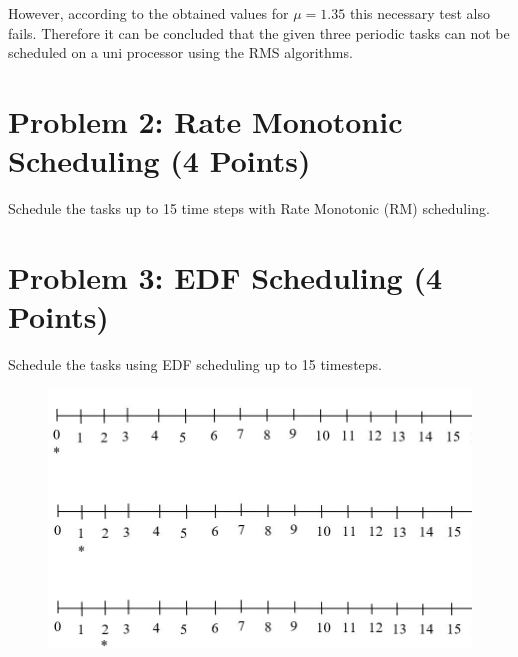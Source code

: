 \documentclass[11pt,letterpaper]{article}
\begin{document}
However, according to the obtained values for $\mu = 1.35$ this necessary test also fails. Therefore it can be concluded that the given three periodic tasks can not be scheduled on  a uni processor using the RMS algorithms.
	\newpage
	\section*{Problem 2: Rate Monotonic Scheduling (4 Points)}
	
	Schedule the tasks up to 15 time steps with Rate Monotonic (RM) scheduling.
	
	\begin{figure}[h]
		\centering
	\end{figure}
	
	\newpage
	\section*{Problem 3: EDF Scheduling (4 Points)}
	
	Schedule the tasks using EDF scheduling up to 15 timesteps.
	
	
	\begin{figure}[h]
		\centering
		\includegraphics[width=0.8\columnwidth]{images/assignment4-timesteps.jpg}
	\end{figure}
	
\end{document}
